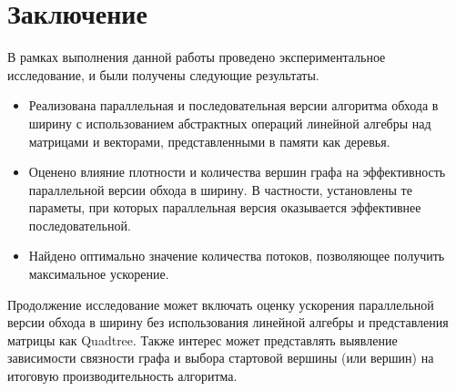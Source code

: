 
\section*{Заключение}
В рамках выполнения данной работы проведено экспериментальное исследование, и были получены следующие результаты.
\begin{itemize}
    \item Реализована параллельная и последовательная версии алгоритма обхода в ширину с использованием абстрактных операций линейной алгебры над матрицами и векторами, представленными в памяти как деревья.
    \item Оценено влияние плотности и количества вершин графа на эффективность параллельной версии обхода в ширину. В частности, установлены те параметы, при которых параллельная версия оказывается эффективнее последовательной.
    \item Найдено оптимально значение количества потоков, позволяющее получить максимальное ускорение.
\end{itemize}

Продолжение исследование может включать оценку ускорения параллельной версии обхода в ширину без использования линейной алгебры и представления матрицы как Quadtree.
Также интерес может представлять выявление зависимости связности графа и выбора стартовой вершины (или вершин) на итоговую производительность алгоритма.